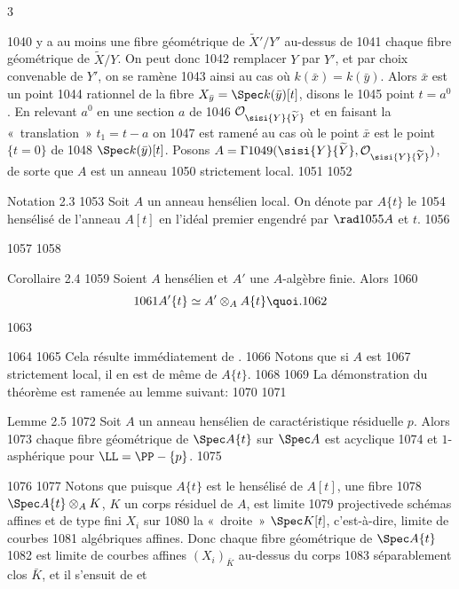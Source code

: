 3	\documentclass[10pt]{../fichiers-configuration-latex/smfart}
\begin{document}
  1040	y a au moins une fibre géométrique de $\widetilde{X}'/Y'$ au-dessus de
  1041	chaque fibre géométrique de $\widetilde{X}/Y$. On peut donc 
  1042	remplacer $Y$ par $Y'$, et par choix convenable de $Y'$, on se ramène
  1043	ainsi au cas où $k(\bar{x})=k(\bar{y})$. Alors $\bar{x}$ est un point
  1044	rationnel de la fibre $X_{\bar{y}}=\Spec k(\bar{y})[t]$, disons le
  1045	point $t=a^{0}$. En relevant $a^{0}$ en une section $a$ de
  1046	$\mathcal{O}_{\sisi{Y}{\widetilde{Y}}}$ et en faisant la « translation »  $t_1=t-a$ on
  1047	est ramené au cas où le point $\bar{x}$ est le point $\{t=0\}$ de
  1048	$\Spec k(\bar{y})[t]$. Posons $A=\Gamma
  1049	(\sisi{Y}{\widetilde{Y}},\mathcal{O}_{\sisi{Y}{\widetilde{Y}}})$, de sorte que $A$ est un anneau
  1050	strictement local.
  1051	
  1052	\begin{enonce*}[remark]{Notation 2.3}
  1053	Soit $A$ un anneau hensélien local. On dénote par $A\{t\}$ le
  1054	hensélisé de l'anneau $A[t]$ en l'idéal premier engendré par $\rad
  1055	A$ et $t$.
  1056	\end{enonce*}
  1057	
  1058	\begin{enonce*}{Corollaire 2.4}
  1059	Soient $A$ hensélien et $A'$ une $A$-algèbre finie. Alors
  1060	$$
  1061	A'\{t\}\simeq A'\otimes_A A\{t\}{\quoi}.
  1062	$$
  1063	\end{enonce*}
  1064	
  1065	Cela résulte immédiatement de .
  1066	Notons que si $A$ est
  1067	strictement local, il en est de même de $A\{t\}$.
  1068	
  1069	La démonstration du théorème est ramenée au lemme suivant:
  1070	
  1071	\begin{enonce*}{Lemme 2.5}
  1072	Soit $A$ un anneau hensélien de caractéristique résiduelle $p$. Alors
  1073	chaque fibre géométrique de $\Spec A\{t\}$ sur $\Spec A$ est acyclique
  1074	et $1$-asphérique pour $\LL=\PP-\{p\}$.
  1075	\end{enonce*}
  1076	
  1077	Notons que puisque $A\{t\}$ est le hensélisé de $A[t]$, une fibre
  1078	$\Spec A\{t\}\otimes_A K$, $K$ un corps résiduel de $A$, est limite
  1079	projective\pageoriginale de schémas affines et de type fini $X_i$ sur
  1080	la « droite »  $\Spec K[t]$, c'est-à-dire, limite de courbes
  1081	algébriques affines. Donc chaque fibre géométrique de $\Spec A\{t\}$
  1082	est limite de courbes affines $(X_i)_{\bar{K}}$ au-dessus du corps
  1083	séparablement clos $\bar{K}$, et il s'ensuit de  et 
\end{document}
